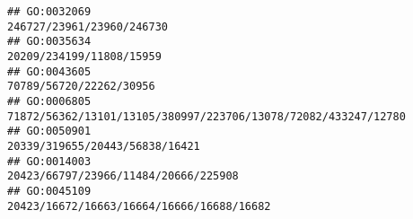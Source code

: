 \documentclass[
]{article}
\begin{document}
\begin{verbatim}
## GO:0032069                                                                                                                                                                                                                                                                                                                                                                                    246727/23961/23960/246730
## GO:0035634                                                                                                                                                                                                                                                                                                                                                                                     20209/234199/11808/15959
## GO:0043605                                                                                                                                                                                                                                                                                                                                                                                      70789/56720/22262/30956
## GO:0006805                                                                                                                                                                                                                                                                                                                                               71872/56362/13101/13105/380997/223706/13078/72082/433247/12780
## GO:0050901                                                                                                                                                                                                                                                                                                                                                                               20339/319655/20443/56838/16421
## GO:0014003                                                                                                                                                                                                                                                                                                                                                                         20423/66797/23966/11484/20666/225908
## GO:0045109                                                                                                                                                                                                                                                                                                                                                                    20423/16672/16663/16664/16666/16688/16682

\end{verbatim}
\end{document}
